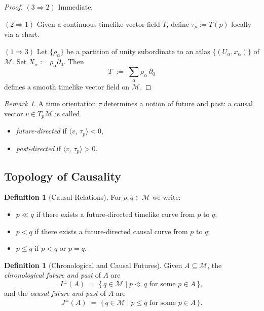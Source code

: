 \documentclass[12pt, a4paper]{article}
\theoremstyle{plain}
\theoremstyle{definition}
\newtheorem{definition}[theorem]{Definition}
\theoremstyle{remark}
\newtheorem{remark}[theorem]{Remark}
\newcommand{\M}{\mathcal{M}}
\newcommand{\ls}[2]{\langle #1,\, #2 \rangle}
\begin{document}
\begin{proof}
  $(3 \Rightarrow 2)$ Immediate.

  $(2 \Rightarrow 1)$ Given a continuous timelike vector field $T$, define $\tau_p := T(p)$ locally via
  a chart.

  $(1 \Rightarrow 3)$ Let $\{\rho_\alpha\}$ be a partition of unity subordinate to an atlas
  $\{(U_\alpha, x_\alpha)\}$ of $\M$. Set $X_\alpha := \rho_\alpha \partial_0$. Then
  \[
    T \;:=\; \sum_\alpha \rho_\alpha \,\partial_0
  \]
  defines a smooth timelike vector field on $\M$.
\end{proof}

\begin{remark}
  A time orientation $\tau$ determines a notion of future and past: a causal vector
  $v \in T_p\M$ is called
  \begin{itemize}
    \item \emph{future-directed} if $\ls{v}{\tau_p} < 0$,
    \item \emph{past-directed} if $\ls{v}{\tau_p} > 0$.
  \end{itemize}
\end{remark}

\subsection{Topology of Causality}

\begin{definition}[Causal Relations]
  For $p, q \in \M$ we write:
  \begin{itemize}
    \item $p \ll q$ if there exists a future-directed timelike curve from $p$ to $q$;
    \item $p < q$ if there exists a future-directed causal curve from $p$ to $q$;
    \item $p \leq q$ if $p < q$ or $p = q$.
  \end{itemize}
\end{definition}

\begin{definition}[Chronological and Causal Futures]
  Given $A \subseteq \M$, the \emph{chronological future and past} of $A$ are
  \[
    I^{\pm}(A) \;=\; \bigl\{\,q \in \M \;\big|\; p \ll q \text{ for some } p \in A\,\bigr\},
  \]
  and the \emph{causal future and past} of $A$ are
  \[
    J^{\pm}(A) \;=\; \bigl\{\,q \in \M \;\big|\; p \leq q \text{ for some } p \in A\,\bigr\}.
  \]
\end{definition}
\end{document}
